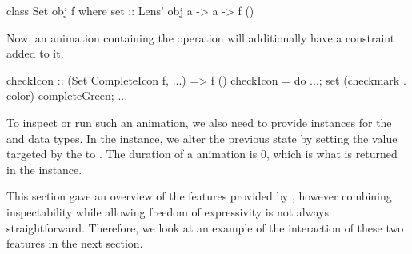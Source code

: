\begin{code}
class Set obj f where
  set :: Lens' obj a -> a -> f ()
\end{code}

Now, an animation containing the  operation will additionally have a  constraint added to it.

\begin{code}
checkIcon :: (Set CompleteIcon f, ...) => f ()
checkIcon = do ...; set (checkmark . color) completeGreen; ...
\end{code}

To inspect or run such an animation, we also need to provide instances for the  and  data types. In the  instance, we alter the previous state by setting the value targeted by the  to . The duration of a  animation is 0, which is what is returned in the  instance.


This section gave an overview of the features provided by \dsl{}, however combining inspectability while allowing freedom of expressivity is not always straightforward. Therefore, we look at an example of the interaction of these two features in the next section.
